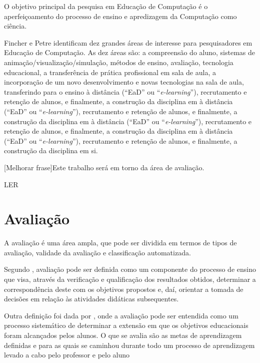 \documentclass[
	12pt,				%
	openright,			%
	oneside,
	a4paper,			%
	english,			%
	french,				%
	spanish,			%
	brazil,				%
	]{abntex2}
\begin{document}
O objetivo principal da pesquisa em Educação de Computação é o aperfeiçoamento do processo de ensino e apredizagem da Computação como ciência. \cite{holmboe2001research}

Fincher e Petre \cite{fincher2005mapping} identificam dez grandes áreas de interesse para pesquisadores em Educação de Computação. As dez áreas são: a compreensão do aluno, sistemas de animação/visualização/simulação, métodos de ensino, avaliação, tecnologia educacional, a transferência de prática profissional em sala de aula, a incorporação de um novo desenvolvimento e novas tecnologias na sala de aula, transferindo para o ensino à distância (“EaD” ou “\textit{e-learning}”), recrutamento e retenção de alunos, e finalmente, a construção da disciplina em à distância (“EaD” ou “\textit{e-learning}”), recrutamento e retenção de alunos, e finalmente, a construção da disciplina em à distância (“EaD” ou “\textit{e-learning}”), recrutamento e retenção de alunos, e finalmente, a construção da disciplina em à distância (“EaD” ou “\textit{e-learning}”), recrutamento e retenção de alunos, e finalmente, a construção da disciplina em si. 

{\color{red}[Melhorar frase]Este trabalho será em torno da área de avaliação.}

{\color{red}LER}
\cite{da2014metodos}

\section{Avaliação}
\label{sec:AVA}
A avaliação é uma área ampla, que pode ser dividida em termos de tipos de avaliação, validade da avaliação e classificação automatizada. \cite{fincher2005mapping}

Segundo , avaliação pode ser definida como um componente do processo de ensino que visa, através da verificação e qualificação dos resultados obtidos, determinar a correspondência  deste com os objetivos propostos e, daí, orientar a tomada de decisões em relação às atividades didáticas subsequentes.

Outra definição foi dada por , onde a avaliação pode ser entendida como um processo sistemático de determinar a extensão em que os objetivos educacionais foram alcançados pelos alunos. O que se avalia são as metas de aprendizagem definidas e para as quais se caminhou durante todo um processo de aprendizagem levado a cabo pelo professor e pelo aluno
\end{document}
